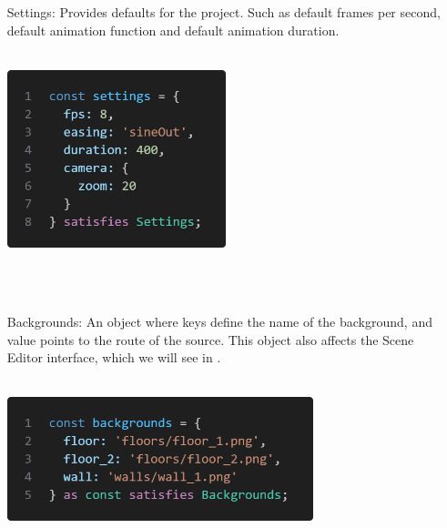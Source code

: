 \documentclass{article}
\begin{document}
\begin{itemize}
    \item[Settings:] Provides defaults for the project. Such as default frames per second, default animation function and default animation duration.\\\\
    \begin{minipage}{\linewidth}
        \centering
        \includegraphics[width=0.5\textwidth]{settings.png}
    \end{minipage}\\\\
    
    \item[Backgrounds:] An object where keys define the name of the background, and value points to the route of the source. This object also affects the Scene Editor interface, which we will see in .\\\\
    \begin{minipage}{\linewidth}
        \centering
        \includegraphics[width=0.7\textwidth]{backgrounds.png}
    \end{minipage}\\\\


\end{itemize}
\end{document}
